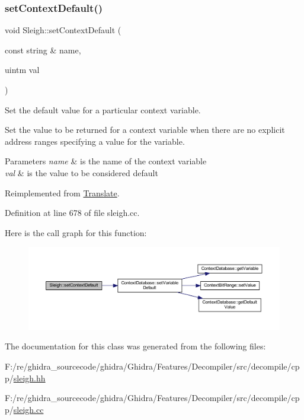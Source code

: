 \subsubsection{\texorpdfstring{setContextDefault()}{setContextDefault()}}
{\footnotesize\ttfamily void Sleigh\+::set\+Context\+Default (\begin{DoxyParamCaption}\item[{const string \&}]{name,  }\item[{uintm}]{val }\end{DoxyParamCaption})\hspace{0.3cm}{\ttfamily [virtual]}}



Set the default value for a particular context variable. 

Set the value to be returned for a context variable when there are no explicit address ranges specifying a value for the variable. 
\begin{DoxyParams}{Parameters}
{\em name} & is the name of the context variable \\
\hline
{\em val} & is the value to be considered default \\
\hline
\end{DoxyParams}


Reimplemented from \mbox{\hyperlink{class_translate_ab608abbfb7f8a0ad21fed57dc00c0439}{Translate}}.



Definition at line 678 of file sleigh.\+cc.

Here is the call graph for this function\+:
\nopagebreak
\begin{figure}[H]
\begin{center}
\leavevmode
\includegraphics[width=350pt]{class_sleigh_ac44342619fef0c42a0f65c415683e58e_cgraph}
\end{center}
\end{figure}


The documentation for this class was generated from the following files\+:\begin{DoxyCompactItemize}
\item 
F\+:/re/ghidra\+\_\+sourcecode/ghidra/\+Ghidra/\+Features/\+Decompiler/src/decompile/cpp/\mbox{\hyperlink{sleigh_8hh}{sleigh.\+hh}}\item 
F\+:/re/ghidra\+\_\+sourcecode/ghidra/\+Ghidra/\+Features/\+Decompiler/src/decompile/cpp/\mbox{\hyperlink{sleigh_8cc}{sleigh.\+cc}}\end{DoxyCompactItemize}
